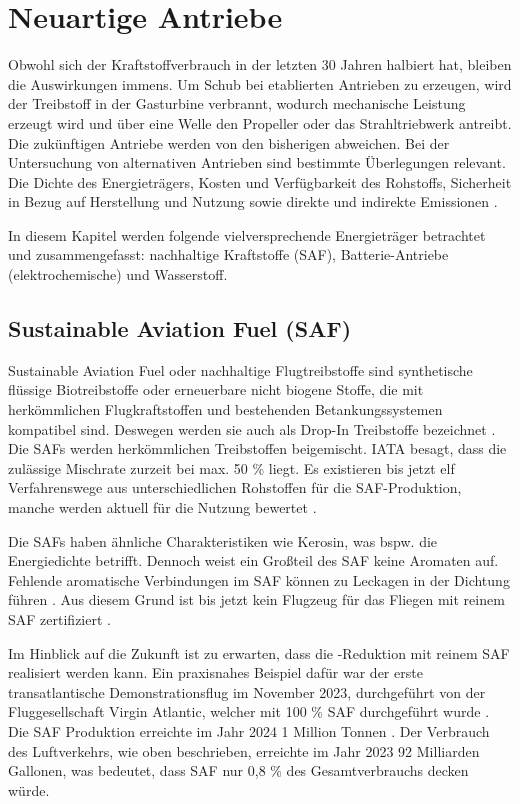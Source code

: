 
\section{Neuartige Antriebe}
\label{s:Neuartige Antriebe}
Obwohl sich der Kraftstoffverbrauch in der letzten 30 Jahren halbiert \cite{mensen2013handbuch} hat, bleiben die Auswirkungen immens.
Um Schub bei etablierten Antrieben zu erzeugen, wird der Treibstoff in der Gasturbine verbrannt, 
wodurch mechanische Leistung erzeugt wird und über eine Welle den 
Propeller oder das Strahltriebwerk antreibt. 
%
Die zukünftigen Antriebe werden von den bisherigen abweichen.
Bei der Untersuchung von alternativen Antrieben sind bestimmte Überlegungen relevant. 
Die Dichte des Energieträgers, Kosten und Verfügbarkeit des Rohstoffs, Sicherheit in Bezug auf Herstellung 
und Nutzung sowie direkte und indirekte  Emissionen \cite{ansell2023review}.

%
In diesem Kapitel werden folgende vielversprechende Energieträger betrachtet und zusammengefasst: 
nachhaltige Kraftstoffe (SAF), Batterie-Antriebe (elektrochemische) und Wasserstoff.

\subsection{Sustainable Aviation Fuel (SAF)}

Sustainable Aviation Fuel oder nachhaltige Flugtreibstoffe sind synthetische flüssige Biotreibstoffe oder erneuerbare nicht biogene Stoffe, %
die mit herkömmlichen Flugkraftstoffen und bestehenden Betankungssystemen kompatibel sind.
Deswegen werden sie auch als Drop-In Treibstoffe bezeichnet \cite{iata_saf_2024}. 
Die SAFs werden herkömmlichen Treibstoffen beigemischt. IATA besagt, dass die zulässige Mischrate 
zurzeit bei max. 50 \% liegt. Es existieren bis jetzt elf Verfahrenswege aus unterschiedlichen Rohstoffen für die SAF-Produktion,
manche werden aktuell für die Nutzung bewertet \cite{icao_saf_conversion_2024}.

Die SAFs haben ähnliche Charakteristiken wie Kerosin, was bspw. die Energiedichte betrifft. 
Dennoch weist ein Großteil des SAF keine Aromaten auf.
Fehlende aromatische Verbindungen im SAF können zu Leckagen in der Dichtung führen \cite{jarin2024emissions}. 
Aus diesem Grund ist bis jetzt kein Flugzeug für das Fliegen mit reinem SAF zertifiziert \cite{iata_saf_2024}.

Im Hinblick auf die Zukunft ist zu erwarten, dass die -Reduktion mit reinem SAF realisiert werden kann.
Ein praxisnahes Beispiel dafür war der erste transatlantische Demonstrationsflug im November 2023, 
durchgeführt von der Fluggesellschaft Virgin Atlantic, welcher mit 100 \% SAF durchgeführt wurde \cite{virginatlantic_saf_2023}. 
Die SAF Produktion erreichte im Jahr 2024 1 Million Tonnen \cite{iata2024}. 
Der Verbrauch des Luftverkehrs, wie oben beschrieben, erreichte im Jahr 2023 92 Milliarden Gallonen, 
was bedeutet, dass SAF nur 0,8 \% des Gesamtverbrauchs decken würde.

